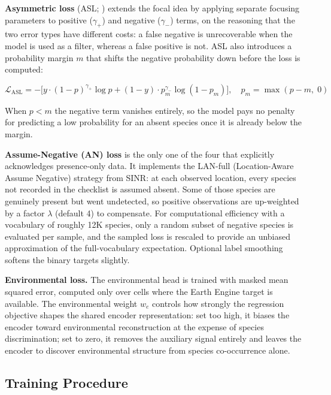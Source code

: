 \textbf{Asymmetric loss} (ASL; \citealp{ridnik2021asymmetric}) extends the focal idea by applying separate focusing parameters to positive ($\gamma_+$) and negative ($\gamma_-$) terms, on the reasoning that the two error types have different costs: a false negative is unrecoverable when the model is used as a filter, whereas a false positive is not. ASL also introduces a probability margin $m$ that shifts the negative probability down before the loss is computed:

\begin{equation*}
\mathcal{L}_\text{ASL} = -\bigl[y \cdot (1-p)^{\gamma_+} \log p + (1-y) \cdot p_m^{\gamma_-} \log(1-p_m)\bigr], \quad p_m = \max(p - m,\; 0)
\end{equation*}

When $p < m$ the negative term vanishes entirely, so the model pays no penalty for predicting a low probability for an absent species once it is already below the margin.

\textbf{Assume-Negative (AN) loss} \citep{cole2023spatial} is the only one of the four that explicitly acknowledges presence-only data. It implements the LAN-full (Location-Aware Assume Negative) strategy from SINR: at each observed location, every species not recorded in the checklist is assumed absent. Some of those species are genuinely present but went undetected, so positive observations are up-weighted by a factor $\lambda$ (default 4) to compensate. For computational efficiency with a vocabulary of roughly 12K species, only a random subset of negative species is evaluated per sample, and the sampled loss is rescaled to provide an unbiased approximation of the full-vocabulary expectation. Optional label smoothing softens the binary targets slightly.

\textbf{Environmental loss.} The environmental head is trained with masked mean squared error, computed only over cells where the Earth Engine target is available. The environmental weight $w_e$ controls how strongly the regression objective shapes the shared encoder representation: set too high, it biases the encoder toward environmental reconstruction at the expense of species discrimination; set to zero, it removes the auxiliary signal entirely and leaves the encoder to discover environmental structure from species co-occurrence alone.

\subsection{Training Procedure}
\label{sec:training}

